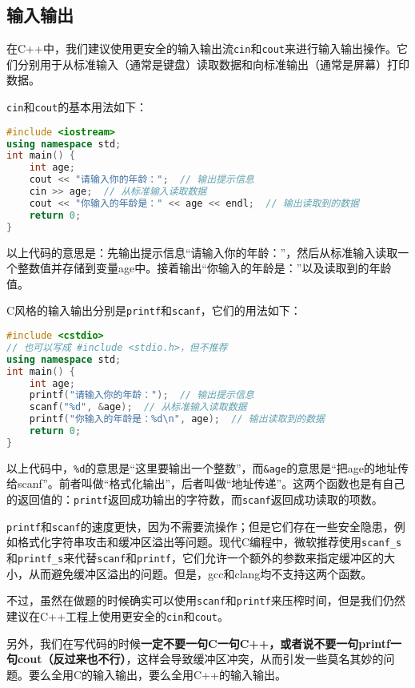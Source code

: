\documentclass[../main.tex]{subfiles}
\begin{document}
\subsection{输入输出}

在C++中，我们建议使用更安全的输入输出流\texttt{cin}和\texttt{cout}来进行输入输出操作。它们分别用于从标准输入（通常是键盘）读取数据和向标准输出（通常是屏幕）打印数据。

\texttt{cin}和\texttt{cout}的基本用法如下：
\begin{lstlisting}[language=C++]
#include <iostream>
using namespace std;
int main() {
    int age;
    cout << "请输入你的年龄：";  // 输出提示信息
    cin >> age;  // 从标准输入读取数据
    cout << "你输入的年龄是：" << age << endl;  // 输出读取到的数据
    return 0;
}
\end{lstlisting}
以上代码的意思是：先输出提示信息“请输入你的年龄：”，然后从标准输入读取一个整数值并存储到变量age中。接着输出“你输入的年龄是：”以及读取到的年龄值。

C风格的输入输出分别是\texttt{printf}和\texttt{scanf}，它们的用法如下：
\begin{lstlisting}[language=C++]
#include <cstdio>
// 也可以写成 #include <stdio.h>，但不推荐
using namespace std;
int main() {
    int age;
    printf("请输入你的年龄：");  // 输出提示信息
    scanf("%d", &age);  // 从标准输入读取数据
    printf("你输入的年龄是：%d\n", age);  // 输出读取到的数据
    return 0;
}
\end{lstlisting}
以上代码中，\texttt{\%d}的意思是“这里要输出一个整数”，而\texttt{\&age}的意思是“把age的地址传给scanf”。前者叫做“格式化输出”，后者叫做“地址传递”。这两个函数也是有自己的返回值的：\texttt{printf}返回成功输出的字符数，而\texttt{scanf}返回成功读取的项数。

\texttt{printf}和\texttt{scanf}的速度更快，因为不需要流操作；但是它们存在一些安全隐患，例如格式化字符串攻击和缓冲区溢出等问题。现代C编程中，微软推荐使用\texttt{scanf\_s}和\texttt{printf\_s}来代替\texttt{scanf}和\texttt{printf}，它们允许一个额外的参数来指定缓冲区的大小，从而避免缓冲区溢出的问题。但是，gcc和clang均不支持这两个函数。

不过，虽然在做题的时候确实可以使用\texttt{scanf}和\texttt{printf}来压榨时间，但是我们仍然建议在C++工程上使用更安全的\texttt{cin}和\texttt{cout}。

另外，我们在写代码的时候{\color{red}\textbf{一定不要一句C一句C++，或者说不要一句printf一句cout（反过来也不行）}}，这样会导致缓冲区冲突，从而引发一些莫名其妙的问题。要么全用C的输入输出，要么全用C++的输入输出。
\end{document}
